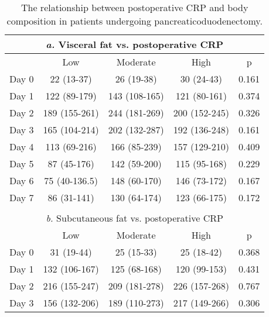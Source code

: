 \begin{table}[p]
	\caption{The relationship  between postoperative CRP and body composition in patients undergoing pancreaticoduodenectomy. }
	\label{table:sirs_bodycomp_crp}
	\centering
	\renewcommand{\arraystretch}{1.2} %
	\setlength{\tabcolsep}{9pt} %
	
	\begin{tabular}{|l c c c c |}
		        \multicolumn{5}{c}{\textit{a.} Visceral fat vs. postoperative CRP}         \\ \hline
		      & Low           & Moderate         & High           & p                      \\
		Day 0 & 22 (13-37)    & 26 (19-38)       & 30 (24-43)     & 0.161                  \\
		Day 1 & 122 (89-179)  & 143 (108-165)    & 121 (80-161)   & 0.374                  \\
		Day 2 & 189 (155-261) & 244 (181-269)    & 200 (152-245)  & 0.326                  \\
		Day 3 & 165 (104-214) & 202 (132-287)    & 192 (136-248)  & 0.161                  \\
		Day 4 & 113 (69-216)  & 166 (85-239)     & 157 (129-210)  & 0.409                  \\
		Day 5 & 87 (45-176)   & 142 (59-200)     & 115 (95-168)   & 0.229                  \\
		Day 6 & 75 (40-136.5) & 148 (60-170)     & 146 (73-172)   & 0.167                  \\
		Day 7 & 86 (31-141)   & 130 (64-174)     & 123 (66-175)   & 0.172                  \\ \hline
		                               \multicolumn{5}{c}{}                                \\
		      \multicolumn{5}{c}{\textit{b.} Subcutaneous fat vs. postoperative CRP}       \\ \hline
		      & Low           & Moderate         & High           & p                      \\
		Day 0 & 31 (19-44)    & 25 (15-33)       & 25 (18-42)     & 0.368                  \\
		Day 1 & 132 (106-167) & 125 (68-168)     & 120 (99-153)   & 0.431                  \\
		Day 2 & 216 (155-247) & 209 (181-278)    & 226 (157-268)  & 0.767                  \\
		Day 3 & 156 (132-206) & 189 (110-273)    & 217 (149-266)  & 0.306                  \\

\end{tabular}
\end{table}
